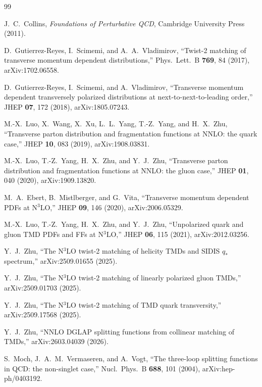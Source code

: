 \documentclass[11pt]{article}
\begin{document}
\small
\begin{thebibliography}{99}

J.~C.~Collins,
\emph{Foundations of Perturbative QCD},
Cambridge University Press (2011).

D.~Gutierrez-Reyes, I.~Scimemi, and A.~A.~Vladimirov,
``Twist-2 matching of transverse momentum dependent distributions,''
Phys.\ Lett.\ B \textbf{769}, 84 (2017), arXiv:1702.06558.

D.~Gutierrez-Reyes, I.~Scimemi, and A.~Vladimirov,
``Transverse momentum dependent transversely polarized distributions at next-to-next-to-leading order,''
JHEP \textbf{07}, 172 (2018), arXiv:1805.07243.

M.-X.~Luo, X.~Wang, X.~Xu, L.~L.~Yang, T.-Z.~Yang, and H.~X.~Zhu,
``Transverse parton distribution and fragmentation functions at NNLO: the quark case,''
JHEP \textbf{10}, 083 (2019), arXiv:1908.03831.

M.-X.~Luo, T.-Z.~Yang, H.~X.~Zhu, and Y.~J.~Zhu,
``Transverse parton distribution and fragmentation functions at NNLO: the gluon case,''
JHEP \textbf{01}, 040 (2020), arXiv:1909.13820.

M.~A.~Ebert, B.~Mistlberger, and G.~Vita,
``Transverse momentum dependent PDFs at N\(^3\)LO,''
JHEP \textbf{09}, 146 (2020), arXiv:2006.05329.

M.-X.~Luo, T.-Z.~Yang, H.~X.~Zhu, and Y.~J.~Zhu,
``Unpolarized quark and gluon TMD PDFs and FFs at N\(^3\)LO,''
JHEP \textbf{06}, 115 (2021), arXiv:2012.03256.

Y.~J.~Zhu,
``The N\(^3\)LO twist-2 matching of helicity TMDs and SIDIS \(q_\ast\) spectrum,''
arXiv:2509.01655 (2025).

Y.~J.~Zhu,
``The N\(^3\)LO twist-2 matching of linearly polarized gluon TMDs,''
arXiv:2509.01703 (2025).

Y.~J.~Zhu,
``The N\(^3\)LO twist-2 matching of TMD quark transversity,''
arXiv:2509.17568 (2025).

Y.~J.~Zhu,
``NNLO DGLAP splitting functions from collinear matching of TMDs,''
arXiv:2603.04039 (2026).

S.~Moch, J.~A.~M.~Vermaseren, and A.~Vogt,
``The three-loop splitting functions in QCD: the non-singlet case,''
Nucl.\ Phys.\ B \textbf{688}, 101 (2004), arXiv:hep-ph/0403192.


\end{thebibliography}
\end{document}
